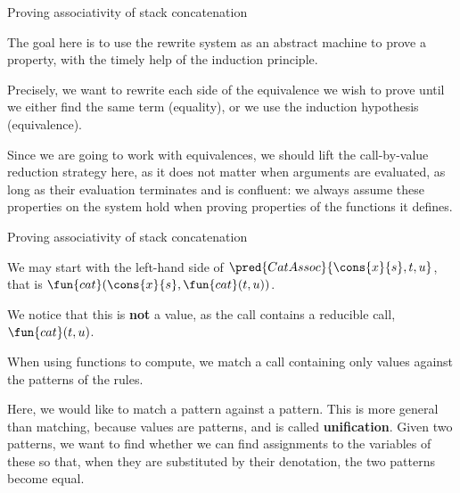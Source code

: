 %
\begin{frame}{Proving associativity of stack concatenation}

  The goal here is to use the rewrite system as an abstract machine to
  prove a property, with the timely help of the induction principle.

  \bigskip

  Precisely, we want to rewrite each side of the equivalence we wish
  to prove until we either find the same term (equality), or we use
  the induction hypothesis (equivalence).

  \bigskip

  Since we are going to work with equivalences, we should lift the
  call\hyp{}by\hyp{}value reduction strategy here, as it does not
  matter when arguments are evaluated, as long as their evaluation
  terminates and is confluent: we always assume these properties on
  the system hold when proving properties of the functions it defines.

\end{frame}

%
\begin{frame}{Proving associativity of stack concatenation}

  We may start with the left\hyp{}hand side of
  \(\pred{CatAssoc}{\cons{x}{s},t,u}\), that is
  \(\fun{cat}(\cons{x}{s},\fun{cat}(t,u))\).

  \bigskip

  We notice that this is \textbf{not} a value, as the call contains a
  reducible call, \(\fun{cat}(t,u)\).

  \bigskip

  When using functions to compute, we match a call containing only
  values against the patterns of the rules.

  \bigskip

  Here, we would like to match a pattern against a pattern. This is
  more general than matching, because values are patterns, and is
  called \textbf{unification}. Given two patterns, we want to find
  whether we can find assignments to the variables of these so that,
  when they are substituted by their denotation, the two patterns
  become equal.

\end{frame}

